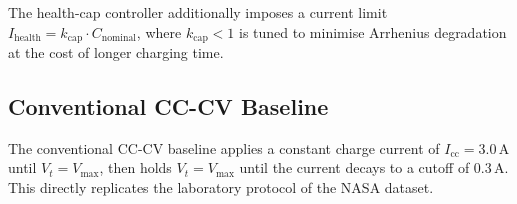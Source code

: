 The health-cap controller additionally imposes a current limit
$I_{\mathrm{health}} = k_{\mathrm{cap}} \cdot C_{\mathrm{nominal}}$,
where $k_{\mathrm{cap}} < 1$ is tuned to minimise Arrhenius
degradation at the cost of longer charging time.

\subsection{Conventional CC-CV Baseline}

The conventional CC-CV baseline applies a constant charge current
of $I_{\mathrm{cc}} = 3.0\,\mathrm{A}$ until
$V_t = V_{\mathrm{max}}$, then holds $V_t = V_{\mathrm{max}}$ until
the current decays to a cutoff of $0.3\,\mathrm{A}$.  This directly
replicates the laboratory protocol of the NASA dataset.
